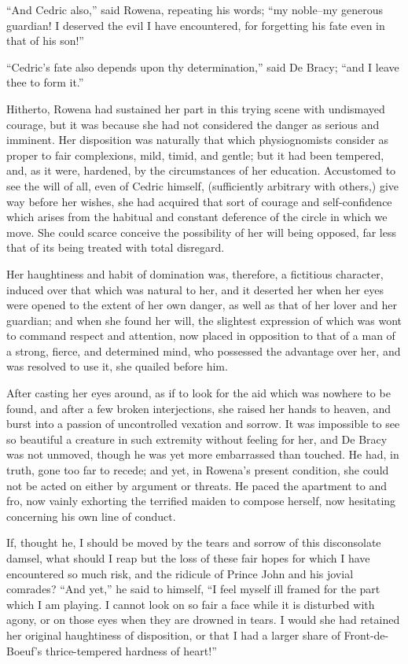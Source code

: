 ``And Cedric also,'' said Rowena, repeating his words; ``my noble--my
generous guardian! I deserved the evil I have encountered, for
forgetting his fate even in that of his son!''

``Cedric's fate also depends upon thy determination,'' said De Bracy;
``and I leave thee to form it.''

Hitherto, Rowena had sustained her part in this trying scene with
undismayed courage, but it was because she had not considered the danger
as serious and imminent. Her disposition was naturally that which
physiognomists consider as proper to fair complexions, mild, timid, and
gentle; but it had been tempered, and, as it were, hardened, by the
circumstances of her education. Accustomed to see the will of all, even
of Cedric himself, (sufficiently arbitrary with others,) give way before
her wishes, she had acquired that sort of courage and self-confidence
which arises from the habitual and constant deference of the circle in
which we move. She could scarce conceive the possibility of her will
being opposed, far less that of its being treated with total disregard.

Her haughtiness and habit of domination was, therefore, a fictitious
character, induced over that which was natural to her, and it deserted
her when her eyes were opened to the extent of her own danger, as well
as that of her lover and her guardian; and when she found her will, the
slightest expression of which was wont to command respect and attention,
now placed in opposition to that of a man of a strong, fierce, and
determined mind, who possessed the advantage over her, and was resolved
to use it, she quailed before him.

After casting her eyes around, as if to look for the aid which was
nowhere to be found, and after a few broken interjections, she raised
her hands to heaven, and burst into a passion of uncontrolled vexation
and sorrow. It was impossible to see so beautiful a creature in such
extremity without feeling for her, and De Bracy was not unmoved, though
he was yet more embarrassed than touched. He had, in truth, gone too far
to recede; and yet, in Rowena's present condition, she could not be
acted on either by argument or threats. He paced the apartment to and
fro, now vainly exhorting the terrified maiden to compose herself, now
hesitating concerning his own line of conduct.

If, thought he, I should be moved by the tears and sorrow of this
disconsolate damsel, what should I reap but the loss of these fair hopes
for which I have encountered so much risk, and the ridicule of Prince
John and his jovial comrades? ``And yet,'' he said to himself, ``I feel
myself ill framed for the part which I am playing. I cannot look on so
fair a face while it is disturbed with agony, or on those eyes when they
are drowned in tears. I would she had retained her original haughtiness
of disposition, or that I had a larger share of Front-de-Boeuf's
thrice-tempered hardness of heart!''

